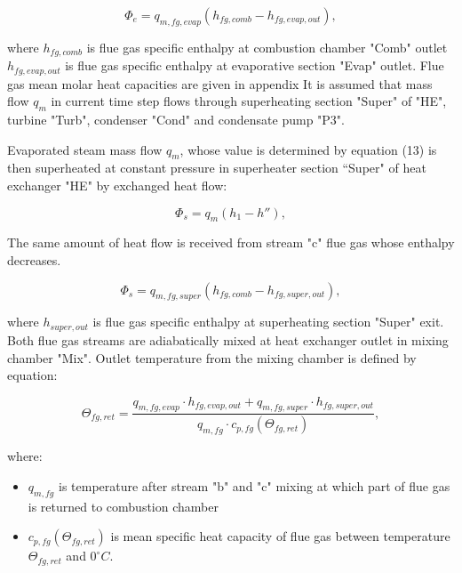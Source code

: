 \documentclass{article}
\begin{document}
	\begin{equation}\label{eq:evap_steam_mass2}
		\Phi_e = q_{m,fg,evap} (h_{fg,comb} - h_{fg,evap,out}),
	\end{equation}
	
	\noindent
	where 
	$h_{fg,comb}$ is flue gas specific enthalpy at combustion chamber "Comb" outlet
	$h_{fg,evap,out}$ is flue gas specific enthalpy at evaporative section "Evap" outlet.
	Flue gas mean molar heat capacities are given in appendix
	It is assumed that mass flow $q_m$ in current time step flows through superheating section "Super" of "HE", turbine "Turb", condenser "Cond" and condensate pump "P3".
	
	Evaporated steam mass flow $q_m$, whose value is determined by equation (13) is then superheated at constant pressure in superheater section “Super" of heat exchanger "HE" by exchanged heat flow:
	
	\begin{equation}\label{eq:evap_steam_mass3}
		\Phi_s = q_m(h_1 - h''),
	\end{equation}
	
	The same amount of heat flow is received from stream "c" flue gas whose enthalpy decreases.
	
	\begin{equation}\label{eq:evap_steam_mass4}
		\Phi_s = q_{m,fg,super} (h_{fg,comb} - h_{fg,super,out}),
	\end{equation}
	
	\noindent
	where $h_{super,out}$ is flue gas specific enthalpy at superheating section "Super" exit. Both flue gas streams are adiabatically mixed at heat exchanger outlet in mixing chamber "Mix". Outlet temperature from the mixing chamber is defined by equation:
	
	\begin{equation}\label{eq:outlet_temp}
		\Theta_{fg,ret} = \frac{q_{m,fg,evap} \cdot h_{fg,evap,out} + q_{m,fg,super} \cdot h_{fg,super,out}}{q_{m,fg} \cdot c_{p,fg} (\Theta_{fg,ret})},
	\end{equation}
	
	\noindent
	where:
	
	\begin{itemize}
		\item $q_{m,fg}$ is temperature after stream "b" and "c" mixing at which part of flue gas is returned to combustion chamber
		\item $c_{p,fg} (\Theta_{fg,ret})$ is mean specific heat capacity of flue gas between temperature $\Theta_{fg,ret}$ and $0^{\circ}C$.
	\end{itemize}
	
\end{document}
